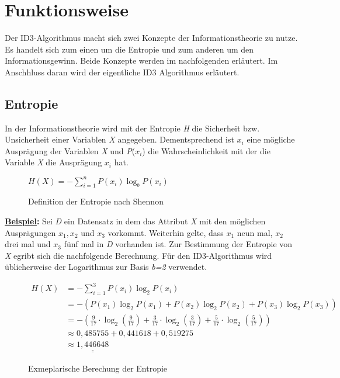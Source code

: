 \section{Funktionsweise}
\label{id3:funktionsweise}

Der ID3-Algorithmus macht sich zwei Konzepte der Informationstheorie zu nutze. Es handelt sich zum einen um die Entropie und zum anderen um den Informationsgewinn. Beide Konzepte werden im nachfolgenden erläutert. Im Anschhluss daran wird der eigentliche ID3 Algorithmus erläutert.

\subsection{Entropie}
\label{id3:entropie}
In der Informationstheorie wird mit der Entropie \textit{H} die Sicherheit bzw. Unsicherheit  einer Variablen \textit{X} angegeben. Dementsprechend ist $x_{i}$ eine mögliche Ausprägung der Variablen \textit{X} und \textit{P}($x_{i}$) die Wahrscheinlichkeit mit der die Variable \textit{X} die Ausprägung $x_{i}$ hat. \autocite{Entropy:online}

\begin{figure}[htbp]
    \vspace{0.5cm}
    \centering
    $ H(X) = - \sum\limits_{i=1}^{n} P(x_{i}) \log_{b} P(x_{i}) $
    \caption{Definition der Entropie nach Shennon\autocite{Entropy:online}}
\end{figure}

\textbf{\underline{Beispiel}:} Sei \textit{D} ein Datensatz in dem  das Attribut \textit{X} mit den möglichen Ausprägungen $x_{1}, x_{2}$ und $x_{3}$ vorkommt. Weiterhin gelte, dass $x_{1}$ neun mal, $x_{2}$ drei mal und $x_{3}$ fünf mal in \textit{D} vorhanden ist. Zur Bestimmung der Entropie von \textit{X} egribt sich die nachfolgende Berechnung. Für den ID3-Algorithmus wird üblicherweise der Logarithmus zur Basis \textit{b=2} verwendet. \autocite{ImplementationID3}

\begin{figure}[htbp]
    \centering
    \begin{align*}
         H(X)   &= - \sum\limits_{i=1}^{3} P(x_{i}) \log_{2} P(x_{i})\\
                &= - (P(x_{1}) \log_{2} P(x_{1}) + P(x_{2}) \log_{2} P(x_{2}) + P(x_{3}) \log_{2} P(x_{3}))\\
                &= -\left(\frac{9}{17} \cdot \log_{2} \left(\frac{9}{17}\right) + %
                    \frac{3}{17} \cdot \log_{2} \left(\frac{3}{17}\right) + %
                    \frac{5}{17} \cdot \log_{2} \left(\frac{5}{17}\right)\right)\\
                &\approx 0,485755 + 0,441618 + 0,519275\\
                &\approx \underline{\underline{1,446648}}
    \end{align*}
    \caption{Exmeplarische Berechung der Entropie}
\end{figure}
\pagebreak
